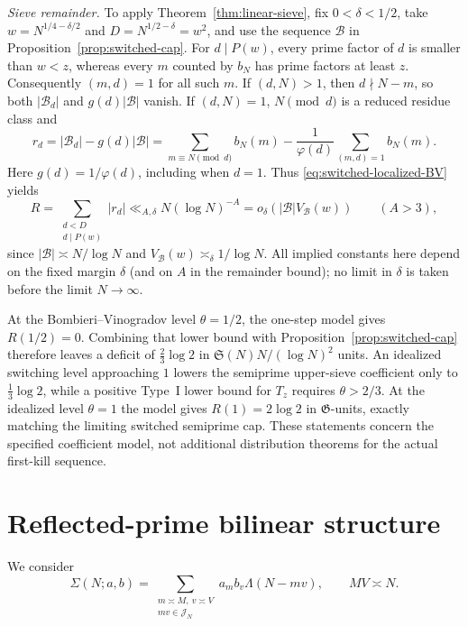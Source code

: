 \documentclass[final,11pt]{elsarticle}
\theoremstyle{definition}
\theoremstyle{remark}
\newcommand{\Sg}{\mathfrak{S}}
\newcommand{\GG}{\mathfrak{G}}
\newcommand{\cband}{\mathcal{J}_N}
\numberwithin{equation}{section}
\begin{document}
\noindent\emph{Sieve remainder.}
To apply Theorem~\ref{thm:linear-sieve}, fix
$0<\delta<1/2$, take $w=N^{1/4-\delta/2}$ and
$D=N^{1/2-\delta}=w^2$, and use the sequence
$\mathcal B$ in Proposition~\ref{prop:switched-cap}.
For $d\mid P(w)$, every prime factor of $d$ is smaller than
$w<z$, whereas every $m$ counted by $b_N$ has prime factors
at least $z$. Consequently $(m,d)=1$ for all such $m$.
If $(d,N)>1$, then $d\nmid N-m$, so both
$|\mathcal B_d|$ and $g(d)|\mathcal B|$ vanish. If $(d,N)=1$,
$N\pmod d$ is a reduced residue class and
\[
 r_d=|\mathcal B_d|-g(d)|\mathcal B|
 =\sum_{m\equiv N\pmod d}b_N(m)
 -\frac1{\varphi(d)}\sum_{(m,d)=1}b_N(m).
\]
Here $g(d)=1/\varphi(d)$, including when $d=1$.
Thus \eqref{eq:switched-localized-BV} yields
\begin{equation}\label{eq:switched-sieve-remainder}
 R=\sum_{\substack{d<D\\d\mid P(w)}}|r_d|
 \ll_{A,\delta}N(\log N)^{-A}
 =o_\delta\!\left(|\mathcal B|V_{\mathcal B}(w)\right)
 \qquad(A>3),
\end{equation}
since $|\mathcal B|\asymp N/\log N$ and
$V_{\mathcal B}(w)\asymp_\delta1/\log N$.
All implied constants here depend on the fixed margin $\delta$
(and on $A$ in the remainder bound); no limit in $\delta$
is taken before the limit $N\to\infty$.

At the Bombieri--Vinogradov level $\theta=1/2$, the one-step
model gives $R(1/2)=0$. Combining that lower bound with
Proposition~\ref{prop:switched-cap} therefore leaves a deficit of
$\frac23\log2$ in $\Sg(N)N/(\log N)^2$ units. An idealized
switching level approaching $1$ lowers the semiprime upper-sieve
coefficient only to $\frac13\log2$, while a positive Type~I lower
bound for $T_z$ requires $\theta>2/3$. At the idealized level
$\theta=1$ the model gives $R(1)=2\log2$ in $\GG$-units, exactly
matching the limiting switched semiprime cap. These statements
concern the specified coefficient model, not additional distribution
theorems for the actual first-kill sequence.


\section{Reflected-prime bilinear structure}\label{sec:block5}

We consider
\[
\Sigma(N;a,b)=\sum_{\substack{m\asymp M,\ v\asymp V\\ mv\in\cband}}a_mb_v\Lambda(N-mv),\qquad MV\asymp N .
\]
\end{document}
